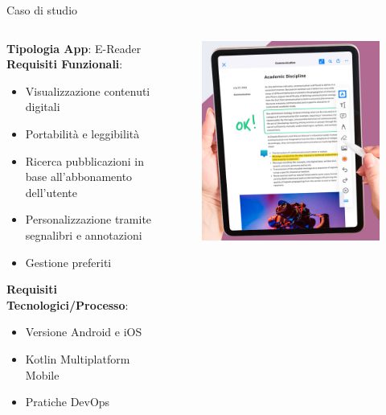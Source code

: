 \begin{frame}{Caso di studio}
    \begin{columns}[onlytextwidth]
        \begin{column}{0.5\textwidth}
            \textbf{Tipologia App}: E-Reader\\
            \vspace{5mm}
            \textbf{Requisiti Funzionali}:
            \begin{itemize}
                \item Visualizzazione contenuti digitali
                \item Portabilità e leggibilità
                \item Ricerca pubblicazioni in base all'abbonamento dell'utente
                \item Personalizzazione tramite segnalibri e annotazioni
                \item Gestione preferiti
            \end{itemize}
            \vspace{5mm}
            \textbf{Requisiti Tecnologici/Processo}:
            \begin{itemize}
                \item Versione Android e iOS
                \item Kotlin Multiplatform Mobile
                \item Pratiche DevOps
            \end{itemize}
        \end{column}
        \begin{column}{0.45\textwidth}
             \begin{figure}[H]
                \includegraphics[width=1\textwidth]{img/e-reader.png}

\end{figure}
\end{column}
\end{columns}
\end{frame}
